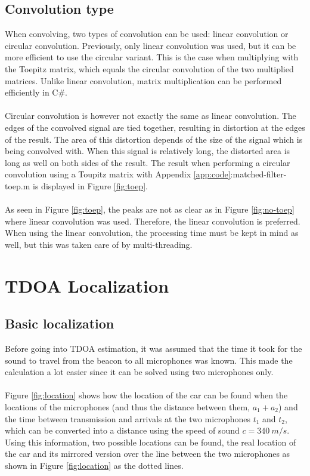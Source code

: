 \documentclass[final]{scrreprt} %
\begin{document}
\subsection{Convolution type}
When convolving, two types of convolution can be used: linear convolution or circular convolution.
Previously, only linear convolution was used, but it can be more efficient to use the circular variant.
This is the case when multiplying with the Toepitz matrix, which equals the circular convolution of the two multiplied matrices.
Unlike linear convolution, matrix multiplication can be performed efficiently in C\#.
\\ \\
Circular convolution is however not exactly the same as linear convolution.
The edges of the convolved signal are tied together, resulting in distortion at the edges of the result.
The area of this distortion depends of the size of the signal which is being convolved with.
When this signal is relatively long, the distorted area is long as well on both sides of the result.
The result when performing a circular convolution using a Toupitz matrix with Appendix \ref{app:code}:matched-filter-toep.m is displayed in Figure \ref{fig:toep}.
\\ \\
As seen in Figure \ref{fig:toep}, the peaks are not as clear as in Figure \ref{fig:no-toep} where linear convolution was used.
Therefore, the linear convolution is preferred.
When using the linear convolution, the processing time must be kept in mind as well, but this was taken care of by multi-threading.

\section{TDOA Localization}
\subsection{Basic localization}
Before going into TDOA estimation, it was assumed that the time it took for the sound to travel from the beacon to all microphones was known.
This made the calculation a lot easier since it can be solved using two microphones only.
\\ \\
Figure \ref{fig:location} shows how the location of the car can be found when the locations of the microphones (and thus the distance between them, $a_1 + a_2$) and the time between transmission and arrivals at the two microphones $t_1$ and $t_2$, which can be converted into a distance using the speed of sound $c = 340~m/s$.
Using this information, two possible locations can be found, the real location of the car and its mirrored version over the line between the two microphones as shown in Figure \ref{fig:location} as the dotted lines.
\end{document}
